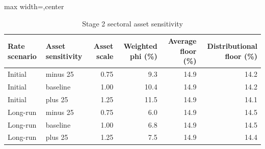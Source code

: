 \begin{table}[H]
\centering
\scriptsize
\caption{Stage 2 sectoral asset sensitivity}
\label{tab:app_stage2_asset_sensitivity}
\begin{adjustbox}{max width=\textwidth,center}
\begin{tabular}{@{}llrrrr@{}}
\toprule
Rate scenario & Asset sensitivity & Asset scale & Weighted phi (\%) & Average floor (\%) & Distributional floor (\%) \\
\midrule
Initial & minus 25 & 0.75 &  9.3 & 14.9 & 14.2 \\
Initial & baseline & 1.00 & 10.4 & 14.9 & 14.2 \\
Initial & plus 25 & 1.25 & 11.5 & 14.9 & 14.1 \\
Long-run & minus 25 & 0.75 &  6.0 & 14.9 & 14.5 \\
Long-run & baseline & 1.00 &  6.8 & 14.9 & 14.5 \\
Long-run & plus 25 & 1.25 &  7.5 & 14.9 & 14.4 \\
\bottomrule
\end{tabular}
\end{adjustbox}
\end{table}
